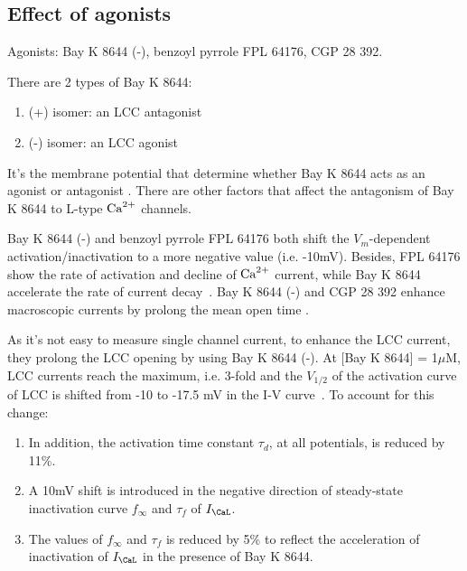 \subsection{Effect of agonists}
\label{sec:DHPR_agonists}

Agonists: Bay K 8644 (-), benzoyl pyrrole FPL 64176, CGP 28 392.

\begin{framed}
There are 2 types of Bay K 8644:
\begin{enumerate}
\item (+) isomer: an LCC antagonist
\item (-) isomer: an LCC agonist
\end{enumerate}
It's the membrane potential that determine whether Bay K 8644 acts as an agonist
or antagonist \citep{Sanguinetti1986}. There are other factors that affect the
antagonism of Bay K 8644 to L-type ${\text{Ca}^{2+}}$ channels.
\end{framed}
  
Bay K 8644 (-) and benzoyl pyrrole FPL 64176 both shift the
$V_m$-dependent activation/inactivation to a more negative value (i.e. -10mV).
Besides, FPL 64176 show the rate of activation and decline of ${\text{Ca}^{2+}}$ current,
while Bay K 8644 accelerate the rate of current decay~\citep{fan2000}. Bay K
8644 (-) and CGP 28 392 enhance macroscopic currents by prolong the mean open
time \citep{hess1984, kokubun1984}. 


As it's not easy to measure single channel current, to enhance the LCC current,
they prolong the LCC opening by using Bay K 8644 (-). At [Bay K 8644] = 1$\mu$M,
LCC currents reach the maximum, i.e. 3-fold and the $V_{1/2}$ of the activation
curve of LCC is shifted from -10 to -17.5 mV in the I-V
curve~\citep{january1988}. To account for this change:
\begin{enumerate}
\item In addition, the activation time constant $\tau_d$, at all
  potentials, is reduced by 11\%.

\item A 10mV shift is introduced in the negative direction of
  steady-state inactivation curve $f_\infty$ and $\tau_f$ of $I_\CaL$.
\item The values of $f_\infty$ and $\tau_f$ is reduced by 5\% to
  reflect the acceleration of inactivation of $I_\CaL$ in the presence
  of Bay K 8644. 
\end{enumerate}

